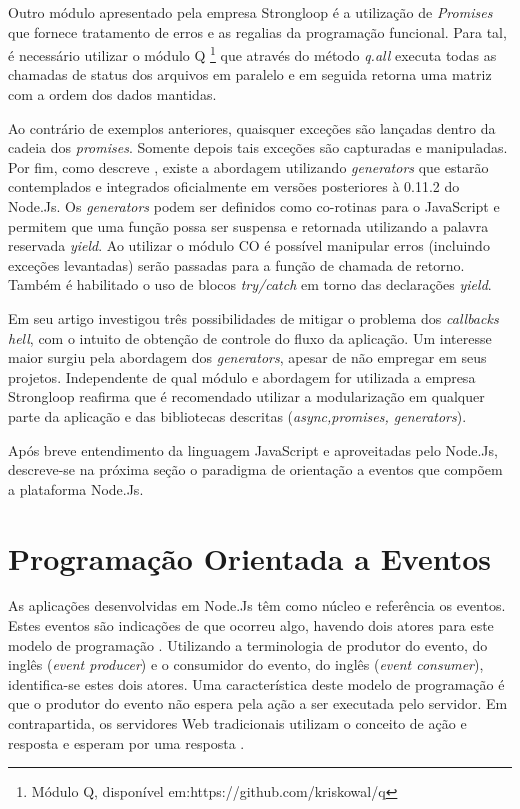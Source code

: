   Outro módulo apresentado pela empresa Strongloop é a utilização de \textit{Promises} que fornece tratamento de erros
  e as regalias da programação funcional. Para tal, é necessário utilizar o módulo Q \footnote{Módulo Q, disponível em:https://github.com/kriskowal/q}
  que através do método \textit{q.all} executa todas as chamadas de status dos arquivos em paralelo e em seguida retorna uma matriz
  com a ordem dos dados mantidas. 
  
  Ao contrário de exemplos anteriores, quaisquer exceções são lançadas dentro da cadeia dos
  \textit{promises}. Somente depois tais exceções são capturadas e manipuladas.
  Por fim, como descreve , existe a abordagem utilizando \textit{generators} que estarão
  contemplados e integrados oficialmente em versões posteriores à 0.11.2 do Node.Js. Os \textit{generators} podem ser definidos
  como co-rotinas para o JavaScript e permitem que uma função possa ser suspensa e retornada
  utilizando a palavra reservada \textit{yield}. Ao utilizar o módulo CO é possível manipular erros (incluindo exceções levantadas)
  serão passadas para a função de chamada de retorno. Também é habilitado o uso de blocos \textit{try/catch} em torno das 
  declarações \textit{yield}.
  
  Em seu artigo  investigou três possibilidades de mitigar o problema dos \textit{callbacks hell}, com o 
  intuito de obtenção de controle do fluxo da aplicação. Um interesse maior surgiu pela abordagem dos \textit{generators},
  apesar de não empregar em seus projetos. Independente de qual módulo e abordagem for utilizada a empresa Strongloop reafirma que é recomendado
  utilizar a modularização em qualquer parte da aplicação e das bibliotecas descritas (\textit{async,promises, generators}).
  
  Após breve entendimento da linguagem JavaScript e aproveitadas pelo Node.Js, descreve-se na próxima seção
  o paradigma de orientação a eventos que compõem a plataforma Node.Js.
  
  
\section{Programação Orientada a Eventos}
\label{programacao-orientada-a-eventos}

  
  As aplicações desenvolvidas em Node.Js têm como núcleo e referência os eventos. Estes eventos são indicações de que ocorreu algo, 
  havendo dois atores para este modelo de programação \cite{Oliveira:2012}. Utilizando a terminologia de produtor do evento, 
  do inglês (\textit{event producer}) e o consumidor do evento, do inglês (\textit{event consumer}), identifica-se estes dois atores. 
  Uma característica deste modelo de programação é que o produtor do evento não espera pela ação a ser executada  pelo servidor. 
  Em contrapartida, os servidores Web tradicionais utilizam o conceito de ação e resposta e esperam por uma resposta \cite{Junior:2012}.
  
